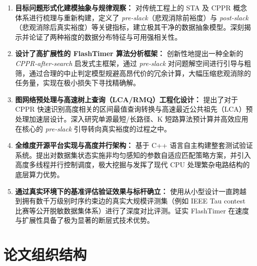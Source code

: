 \begin{enumerate}
    \item \textbf{目标问题形式化建模抽象与规律观察：} 对传统工程上的 STA 及 CPPR 概念体系进行梳理与重新构建，定义了 \textit{pre-slack}（悲观消除前裕度）与 \textit{post-slack}（悲观消除后真实裕度）等关键指标，建立极其干净的数据抽象模型。深刻揭示并论证了两种裕度的数据分布特征与可用强相关性。
    \item \textbf{设计了高扩展性的 FlashTimer 算法分析框架：} 创新性地提出一种全新的 \textit{CPPR-after-search} 启发式主框架，通过 \textit{pre-slack} 对问题解空间进行引导与粗筛，通过合理的中止判定模型规避高昂代价的冗余计算，大幅压缩悲观消除的任务量，实现在极小损失下寻找精确解。
    \item \textbf{图网络预处理与高速树上查询（LCA/RMQ）工程化设计：} 提出了对于 CPPR 快速识别高度相关的区间最值查询转换与高速最近公共祖先（LCA）预处理加速层设计。深入研究单源最短/长路径、K 短路算法预计算并高效应用在核心的 \textit{pre-slack} 引导转向真实裕度的过程之中。
    \item \textbf{全维度开源平台实现与高度并行架构：} 基于 C++ 语言自主构建整套测试验证系统。提出对数据集状态实施非均匀感知的参数自适应匹配策略方案，并引入高度多线程并行控制调度，极大挖掘与发挥了现代 CPU 处理繁杂电路结构的底层算力优势。
    \item \textbf{通过真实环境下的基准评估验证效果与标杆确立：} 使用从小型设计一直跨越到拥有数千万级别时序约束边的真实大规模评测集（例如 IEEE Tau contest 比赛等公开脱敏数据集体系）进行了深度对比评测。证实 FlashTimer 在速度与扩展性具备了极为显著的断层式技术优势。
\end{enumerate}

\section{论文组织结构}

